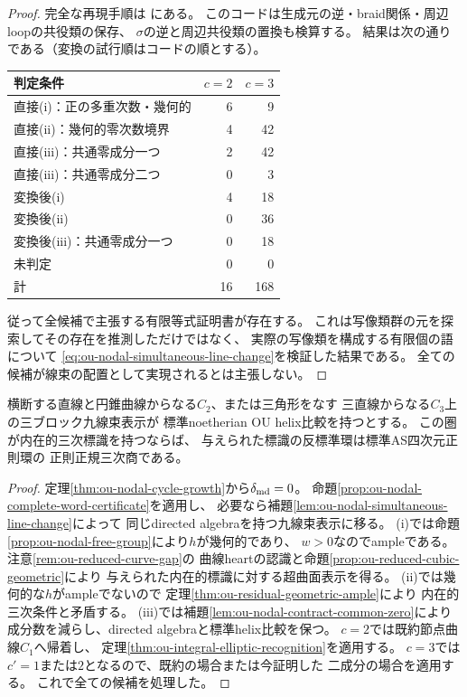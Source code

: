 \begin{proof}
完全な再現手順は
にある。
このコードは生成元の逆・braid関係・周辺loopの共役類の保存、
$\sigma$の逆と周辺共役類の置換も検算する。
結果は次の通りである（変換の試行順はコードの順とする）。
\begin{center}
\begin{tabular}{lrr}
\toprule
判定条件 & $c=2$ & $c=3$\\
\midrule
直接(i)：正の多重次数・幾何的 &6&9\\
直接(ii)：幾何的零次数境界 &4&42\\
直接(iii)：共通零成分一つ &2&42\\
直接(iii)：共通零成分二つ &0&3\\
変換後(i) &4&18\\
変換後(ii) &0&36\\
変換後(iii)：共通零成分一つ &0&18\\
未判定 &0&0\\
\midrule
計 &16&168\\
\bottomrule
\end{tabular}
\end{center}
従って全候補で主張する有限等式証明書が存在する。
これは写像類群の元を探索してその存在を推測しただけではなく、
実際の写像類を構成する有限個の語について
\eqref{eq:ou-nodal-simultaneous-line-change}を検証した結果である。
全ての候補が線束の配置として実現されるとは主張しない。
\end{proof}

\begin{theorem}[被約節点cycle型の内在的三次超曲面認識]
\label{thm:ou-nodal-complete-recognition}
横断する直線と円錐曲線からなる$C_2$、または三角形をなす
三直線からなる$C_3$上の三ブロック九線束表示が
標準noetherian OU helix比較を持つとする。
この圏が内在的三次標識を持つならば、
与えられた標識の反標準環は標準AS四次元正則環の
正則正規三次商である。
\end{theorem}
\begin{proof}
定理\ref{thm:ou-nodal-cycle-growth}から$\delta_{\rm md}=0$。
命題\ref{prop:ou-nodal-complete-word-certificate}を適用し、
必要なら補題\ref{lem:ou-nodal-simultaneous-line-change}によって
同じdirected algebraを持つ九線束表示に移る。
(i)では命題\ref{prop:ou-nodal-free-group}により$h$が幾何的であり、
$w>0$なのでampleである。注意\ref{rem:ou-reduced-curve-gap}の
曲線heartの認識と命題\ref{prop:ou-reduced-cubic-geometric}により
与えられた内在的標識に対する超曲面表示を得る。
(ii)では幾何的な$h$がampleでないので
定理\ref{thm:ou-residual-geometric-ample}により
内在的三次条件と矛盾する。
(iii)では補題\ref{lem:ou-nodal-contract-common-zero}により
成分数を減らし、directed algebraと標準helix比較を保つ。
$c=2$では既約節点曲線$C_1$へ帰着し、
定理\ref{thm:ou-integral-elliptic-recognition}を適用する。
$c=3$では$c'=1$または$2$となるので、既約の場合または今証明した
二成分の場合を適用する。
これで全ての候補を処理した。
\end{proof}

